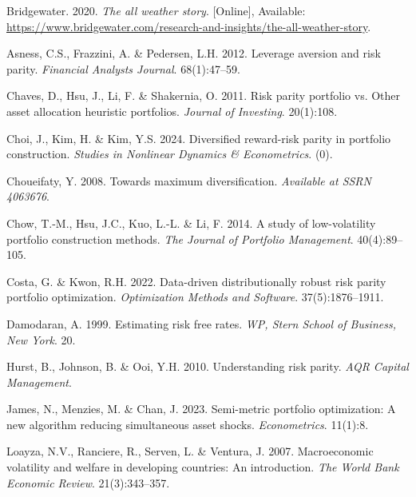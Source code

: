 \documentclass[11pt,preprint]{elsarticle}
\numberwithin{equation}{section}
\numberwithin{figure}{section}
\numberwithin{table}{section}
\newlength{\cslhangindent}
\newenvironment{CSLReferences}[2] %
{\begin{list}{}{%
	\setlength{\itemindent}{0pt}
	\setlength{\leftmargin}{0pt}
	\setlength{\parsep}{0pt}
	\ifodd #1
	\setlength{\leftmargin}{\cslhangindent}
	\setlength{\itemindent}{-1\cslhangindent}
	\fi
	\setlength{\itemsep}{#2\baselineskip}}}
{\end{list}}
\begin{document}
\label{refs}
\begin{CSLReferences}{1}{1}
Bridgewater. 2020. \emph{The all weather story}. {[}Online{]},
Available:
\url{https://www.bridgewater.com/research-and-insights/the-all-weather-story}.

Asness, C.S., Frazzini, A. \& Pedersen, L.H. 2012. Leverage aversion and
risk parity. \emph{Financial Analysts Journal}. 68(1):47--59.

Chaves, D., Hsu, J., Li, F. \& Shakernia, O. 2011. Risk parity portfolio
vs. Other asset allocation heuristic portfolios. \emph{Journal of
Investing}. 20(1):108.

Choi, J., Kim, H. \& Kim, Y.S. 2024. Diversified reward-risk parity in
portfolio construction. \emph{Studies in Nonlinear Dynamics \&
Econometrics}. (0).

Choueifaty, Y. 2008. Towards maximum diversification. \emph{Available at
SSRN 4063676}.

Chow, T.-M., Hsu, J.C., Kuo, L.-L. \& Li, F. 2014. A study of
low-volatility portfolio construction methods. \emph{The Journal of
Portfolio Management}. 40(4):89--105.

Costa, G. \& Kwon, R.H. 2022. Data-driven distributionally robust risk
parity portfolio optimization. \emph{Optimization Methods and Software}.
37(5):1876--1911.

Damodaran, A. 1999. Estimating risk free rates. \emph{WP, Stern School
of Business, New York}. 20.

Hurst, B., Johnson, B. \& Ooi, Y.H. 2010. Understanding risk parity.
\emph{AQR Capital Management}.

James, N., Menzies, M. \& Chan, J. 2023. Semi-metric portfolio
optimization: A new algorithm reducing simultaneous asset shocks.
\emph{Econometrics}. 11(1):8.

Loayza, N.V., Ranciere, R., Serven, L. \& Ventura, J. 2007.
Macroeconomic volatility and welfare in developing countries: An
introduction. \emph{The World Bank Economic Review}. 21(3):343--357.


\end{CSLReferences}
\end{document}
